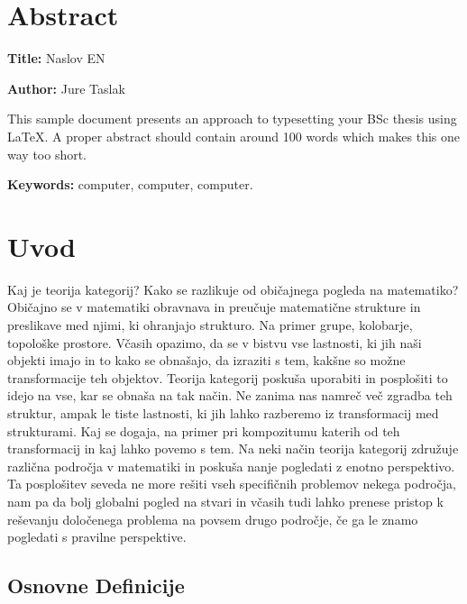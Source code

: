 \documentclass[12pt,a4paper]{book}
\newcommand{\ttitleEn}{Naslov EN}
\newcommand{\tauthor}{Jure Taslak}
\newcommand{\tkeywordsEn}{computer, computer, computer}
\newcommand{\clearemptydoublepage}{\newpage{\pagestyle{empty}\cleardoublepage}}
\theoremstyle{definition}
\theoremstyle{plain}
\theoremstyle{definition}
\theoremstyle{remark}
\begin{document}
\chapter*{Abstract}

\noindent\textbf{Title:} \ttitleEn
\bigskip

\noindent\textbf{Author:} \tauthor
\bigskip

\noindent This sample document presents an approach to typesetting your BSc thesis using \LaTeX. 
A proper abstract should contain around 100 words which makes this one way too short.
\bigskip

\noindent\textbf{Keywords:} \tkeywordsEn.
\clearemptydoublepage

\mainmatter
\setcounter{page}{1}
\pagestyle{fancy}

\chapter{Uvod}
Kaj je teorija kategorij? Kako se razlikuje od običajnega pogleda na matematiko? Običajno se v matematiki obravnava in preučuje matematične strukture in preslikave med njimi, ki ohranjajo strukturo. Na primer grupe, kolobarje, topološke prostore. Včasih opazimo, da se v bistvu vse lastnosti, ki jih naši objekti imajo in to kako se obnašajo, da izraziti s tem, kakšne so možne transformacije teh objektov. Teorija kategorij poskuša uporabiti in posplošiti to idejo na vse, kar se obnaša na tak način. Ne zanima nas namreč več zgradba teh struktur, ampak le tiste lastnosti, ki jih lahko razberemo iz transformacij med strukturami. Kaj se dogaja, na primer pri kompozitumu katerih od teh transformacij in kaj lahko povemo s tem. Na neki način teorija kategorij združuje različna področja v matematiki in poskuša nanje pogledati z enotno perspektivo. Ta posplošitev seveda ne more rešiti vseh specifičnih problemov nekega področja, nam pa da bolj globalni pogled na stvari in včasih tudi lahko prenese pristop k reševanju določenega problema na povsem drugo področje, če ga le znamo pogledati s pravilne perspektive.

\section{Osnovne Definicije}
\end{document}
